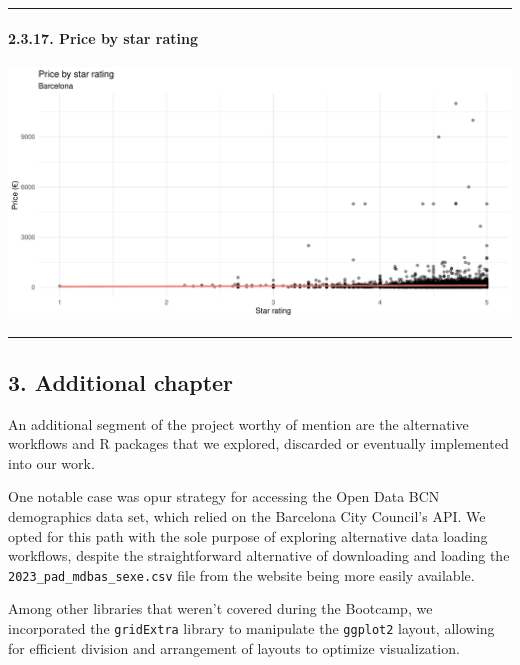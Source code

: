 \documentclass[
]{article}
\begin{document}
\begin{center}\rule{0.5\linewidth}{0.5pt}\end{center}

\hypertarget{price-by-star-rating}{%
\paragraph{2.3.17. Price by star rating}\label{price-by-star-rating}}

\begin{center}\includegraphics{Barcelona-AirBnB-Insights_files/figure-latex/plot17-1} \end{center}

\begin{center}\rule{0.5\linewidth}{0.5pt}\end{center}

\hypertarget{additional-chapter}{%
\subsection{3. Additional chapter}\label{additional-chapter}}

An additional segment of the project worthy of mention are the
alternative workflows and R packages that we explored, discarded or
eventually implemented into our work.

One notable case was opur strategy for accessing the Open Data BCN
demographics data set, which relied on the Barcelona City Council's API.
We opted for this path with the sole purpose of exploring alternative
data loading workflows, despite the straightforward alternative of
downloading and loading the \texttt{2023\_pad\_mdbas\_sexe.csv} file
from the website being more easily available.

Among other libraries that weren't covered during the Bootcamp, we
incorporated the \texttt{gridExtra} library to manipulate the
\texttt{ggplot2} layout, allowing for efficient division and arrangement
of layouts to optimize visualization.
\end{document}
